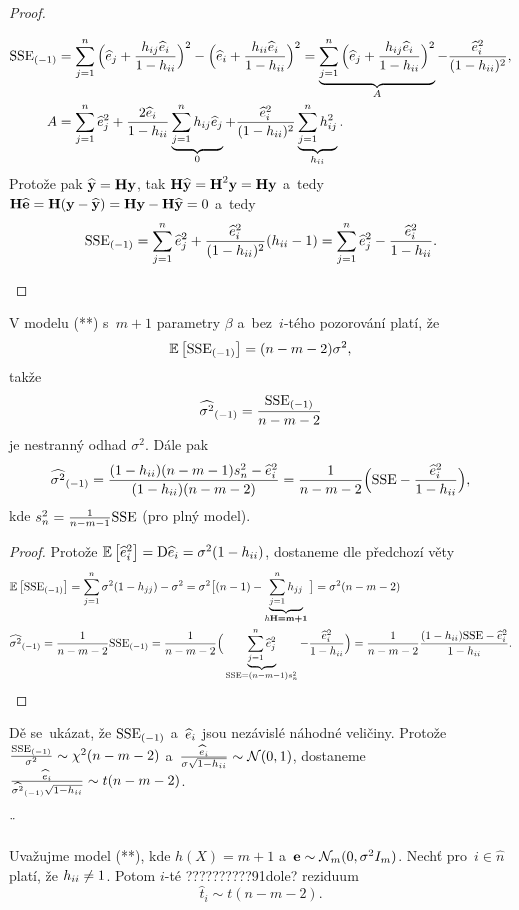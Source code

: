 \begin{theorem}
\begin{proof}
\begin{enumerate}[1)]
\[\begin{split}
	{\mathrm{SSE}_{(-1)}}&=\sum\limits_{j=1}^{n} \Big(\widehat{e}_j+\frac{h_{ij}\widehat{e}_i}{1-h_{ii}}\Big)^2-\Big(\widehat{e}_i+\frac{h_{ii}\widehat{e}_i}{1-h_{ii}}\Big)^2=\underbrace{\sum\limits_{j=1}^{n}\Big(\widehat{e}_j+\frac{h_{ij}\widehat{e}_i}{1-h_{ii}}\Big)^2}_{A}-\frac{\widehat{e}_i^2}{(1-h_{ii})^2},\\
	A&= \sum\limits_{j=1}^{n} \widehat{e}_j^2+\frac{2\widehat{e}_i}{1-h_{ii}}\underbrace{\sum\limits_{j=1}^{n} h_{ij}\widehat{e}_j}_{0}+\frac{\widehat{e}_i^2}{(1-h_{ii})^2}\underbrace{\sum\limits_{j=1}^{n} h_{ij}^2}_{h_{ii}}.
	\end{split}
	\]
		Protože pak $\widehat{\textbf{y}}=\textbf{H}\textbf{y}$, tak $\textbf{H}\widehat{\textbf{y}}=\textbf{H}^2\textbf{y}=\textbf{H}\textbf{y}$ a~tedy $\textbf{H}\widehat{\textbf{e}}=\textbf{H}(\textbf{y}-\widehat{\textbf{y}})=\textbf{H}\textbf{y}-\textbf{H}\widehat{\textbf{y}}=0$ a~tedy 
		$$ {\mathrm{SSE}_{(-1)}}=\sum\limits_{j=1}^{n}\widehat{e}_j^2+\frac{\widehat{e}_i^2}{(1-h_{ii})^2}(h_{ii}-1)=\sum\limits_{j=1}^{n}\widehat{e}_j^2-\frac{\widehat{e}_i^2}{1-h_{ii}}.$$
	\end{enumerate}
\end{proof}
\end{theorem}
\begin{dusl}
	V modelu (**) s~$m+1$ parametry $\beta$ a~bez~$i$-tého pozorování platí, že $$\mathbb{E}\left[ {\mathrm{SSE}_{(-1)}} \right]=(n-m-2)\sigma^2,$$
	takže 
	$$ {\widehat{{\sigma}^2}_{(-1)}}=\frac{{\mathrm{SSE}_{(-1)}}}{n-m-2}$$ je nestranný odhad $\sigma^2$. Dále pak 
	$$ {\widehat{{\sigma}^2}_{(-1)}}=\frac{(1-h_{ii})(n-m-1)s_n^2-\widehat{e}_i^2}{(1-h_{ii})(n-m-2)}=\frac{1}{n-m-2}\Big(\mathrm{SSE} -\frac{\widehat{e}_i^2}{1-h_{ii}}\Big),$$ kde $s_n^2=\frac{1}{n-m-1}\mathrm{SSE}$ (pro plný model).
	\begin{proof}
		Protože $\mathbb{E}\left[ \widehat{e}_i^2 \right]=\mathrm{D} \widehat{e}_i=\sigma^2(1-h_{ii})$, dostaneme dle předchozí věty 
		\[
		\begin{split}
		&\mathbb{E}\left[ {\mathrm{SSE}_{(-1)}} \right]=\sum\limits_{j=1}^{n}\sigma^2(1-h_{jj})-\sigma^2=\sigma^2\big[(n-1)-\underbrace{\sum\limits_{j=1}^{n} h_{jj}}_{h\textbf{H=m+1}}\big]=\sigma^2(n-m-2)\\
		&{\widehat{{\sigma}^2}_{(-1)}}=\frac{1}{n-m-2}{\mathrm{SSE}_{(-1)}}=\frac{1}{n-m-2}\Big(\underbrace{\sum\limits_{j=1}^{n}\widehat{e}_j^2}_{\mathrm{SSE}=(n-m-1)s_n^2}-\frac{\widehat{e}_i^2}{1-h_{ii}}\Big)=\frac{1}{n-m-2}\frac{(1-h_{ii})\mathrm{SSE}-\widehat{e}_i^2}{1-h_{ii}}.
		\end{split}
		\]
	\end{proof}
\end{dusl}
\begin{remark}
	Dě se~ukázat, že ${\mathrm{SSE}_{(-1)}}$ a~$\widehat{e}_i$ jsou nezávislé náhodné veličiny. Protože $\frac{{\mathrm{SSE}_{(-1)}}}{\sigma^2}\sim\chi^2(n-m-2)$ a~$\frac{\widehat{e}_i}{\sigma\sqrt{1-h_{ii}}}\sim\mathcal{N}(0,1)$, dostaneme $\frac{\widehat{e}_i}{{\widehat{{\sigma}^2}_{(-1)}}\sqrt{1-h_{ii}}}\sim t(n-m-2)$.
\end{remark}
¨\begin{corollary}
	Uvažujme model (**), kde $h(X)=m+1$ a~$\textbf{e}\sim\mathcal{N}_m(0,\sigma^2 I_m)$. Nechť pro~$i\in\hat{n}$ platí, že $h_{ii}\neq1$. Potom $i$-té ??????????91dole? reziduum 
	$$ \widehat{t}_i\sim t(n-m-2).$$
\end{corollary}
